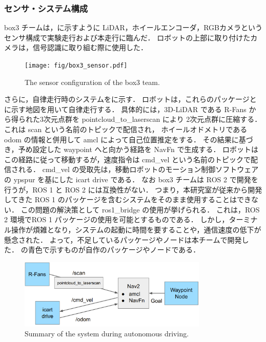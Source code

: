 \documentclass[twocolumn, 9pt]{jsproceedings}
\begin{document}
\subsubsection{センサ・システム構成}
box3 チームは，に示すように LiDAR，ホイールエンコーダ，RGBカメラという
センサ構成で実験走行および本走行に臨んだ．
ロボットの上部に取り付けたカメラは，信号認識に取り組む際に使用した．

\begin{figure}[h!]
  \centering
  \texttt{[image: fig/box3\_sensor.pdf]}
  \caption{The sensor configuration of the box3 team.}
  \label{fig:box3-sensor}
\end{figure}


さらに，自律走行時のシステムをに示す．
ロボットは，これらのパッケージとに示す地図を用いて自律走行する．
具体的には，3D-LiDAR である R-Fans から得られた3次元点群を pointcloud\_to\_laserscan により
2次元点群に圧縮する．これは scan という名前のトピックで配信され，
ホイールオドメトリである odom の情報と併用して amcl\cite{amcl} によって自己位置推定をする．
その結果に基づき，予め設定した waypoint へと向かう経路を NavFn\cite{navfn} で生成する．
ロボットはこの経路に従って移動するが，速度指令は cmd\_vel という名前のトピックで配信される．
cmd\_vel の受取先は，移動ロボットのモーション制御ソフトウェアの ypspur\cite{ypspur} を基にした 
icart drive\cite{icart_driver} である．
なお box3 チームは ROS 2 で開発を行うが，ROS 1 と ROS 2 には互換性がない．
つまり，本研究室が従来から開発してきた ROS 1 のパッケージを含むシステムをそのまま使用することはできない．
この問題の解決策として ros1\_bridge\cite{bridge} の使用が挙げられる．
これは，ROS 2 環境でROS 1 パッケージの使用を可能とするものである．
しかし，ターミナル操作が煩雑となり，システムの起動に時間を要することや，通信速度の低下が懸念された．
よって，不足しているパッケージやノードは本チームで開発した． 
の青色で示すものが自作のパッケージやノードである．

\begin{figure}[h!]
  \centering
  \includegraphics[width=90mm]{fig/box3_system.pdf}
  \caption{Summary of the system during autonomous driving.}
  \label{fig:box3-system}
\end{figure}
\end{document}
